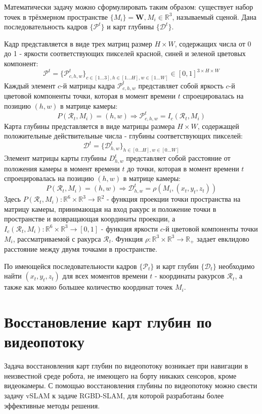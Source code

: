 \documentclass{mipt-thesis-bs}
\begin{document}
Математически задачу можно сформулировать таким образом: существует набор точек в трёхмерном пространстве $\{M_i \} = \textbf{W}, M_i \in \mathbb{R}^3$, называемый сценой. Дана последовательность кадров $\{\mathcal{P}^t\}$ и карт глубины $\{\mathcal{D}^t\}$.

Кадр представляется в виде трех матриц размер $H \times W$, содержащих числа от 0 до 1 - яркости соответствующих пикселей красной, синей и зеленой цветовых компонент:
$$\mathcal{P}^t = \{\mathcal{P}^t_{c,h,w}\}_{c \in [1 \dots 3], h \in [1 \dots H], w \in [1 \dots W]} \in [0, 1]^{3 \times H \times W}$$
Каждый элемент $c$-й матрицы кадра $\mathcal{P}^t_{c,h,w}$ представляет собой яркость $c$-й цветовой компоненты точки, которая в момент времени $t$ спроецировалась на позицию $(h, w)$ в матрице камеры:
$$P(\mathcal{R}_t, M_i) = (h, w) \Rightarrow \mathcal{P}^t_{c,h,w} = I_c(\mathcal{R}_t, M_i)$$
Карта глубины представляется в виде матрицы размера $H \times W$, содержащей положительные действительные числа - глубины соответствующих пикселей:
$$\mathcal{D}^t = \{\mathcal{D}^t_{h,w}\}_{h \in [0 \dots H], w \in [0 \dots W]}$$
Элемент матрицы карты глубины $D^t_{h,w}$ представляет собой расстояние от положения камеры в момент времени $t$ до точки, которая в момент времени $t$ спроецировалась на позицию $(h, w)$ в матрице камеры: 
$$P(\mathcal{R}_t, M_i) = (h, w) \Rightarrow \mathcal{D}^t_{h,w} = \rho(M_i, (x_t, y_t, z_t))$$
Здесь $P(\mathcal{R}_t, M_i): \mathbb{R}^6 \times \mathbb{R}^3 \rightarrow \mathbb{R}^2$ - функция проекции точки пространства на матрицу камеры, принимающая на вход ракурс и положение точки в пространстве и возвращающая координаты проекции, а $I_c (\mathcal{R}_t, M_i): \mathbb{R}^6 \times \mathbb{R}^3 \rightarrow [0, 1]$ - функция яркости $c$-й цветовой компоненты точки $M_i$, рассматриваемой с ракурса $\mathcal{R}_t$. Функция $\rho: \mathbb{R}^3 \times \mathbb{R}^3 \rightarrow \mathbb{R}_{+}$ задает евклидово расстояние между двумя точками в пространстве.

По имеющейся последовательности кадров $\{\mathcal{P}_t\}$ и карт глубин $\{\mathcal{D}_t\}$ необходимо найти $(x_t, y_t, z_t)$ для всех моментов времени $t$ - координаты ракурсов $\mathcal{R}_t$, а также как можно большее количество координат точек $M_i$.

\section{Восстановление карт глубин по видеопотоку}

Задача восстановления карт глубин по видеопотоку возникает при навигации в неизвестной среде робота, не имеющего на борту никаких сенсоров, кроме видеокамеры. С помощью восстановления глубины по видеопотоку можно свести задачу vSLAM к задаче RGBD-SLAM, для которой разработаны более эффективные методы решения.
\end{document}
